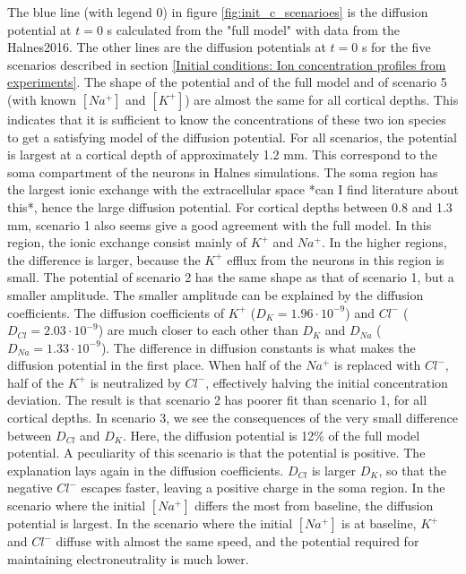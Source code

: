 \documentclass{article}
\begin{document}
The blue line (with legend 0) in figure \ref{fig:init_c_scenarioes} is the diffusion potential at $t=0$ s calculated from the "full model" with data from the Halnes2016. The other lines are the diffusion potentials at $t=0$ s for the five scenarios described in section \ref{Initial conditions: Ion concentration profiles from experiments}.  The shape of the potential and of the full model and of scenario 5 (with known $[Na^+]$ and $[K^+]$) are almost the same for all cortical depths. This indicates that it is sufficient to know the concentrations of these two ion species to get a satisfying model of the diffusion potential. For all scenarios, the potential is largest at a cortical depth of approximately 1.2 mm. This correspond to the soma compartment of the neurons in Halnes simulations. The soma region has the largest ionic exchange with the extracellular space *can I find literature about this*, hence the large diffusion potential. For cortical depths between 0.8 and 1.3 mm, scenario 1 also seems give a good agreement with the full model. In this region, the ionic exchange consist mainly of $K^+$ and $Na^+$. In the higher regions, the difference is larger, because the $K^+$ efflux from the neurons in this region is small. The potential of scenario 2 has the same shape as that of scenario 1, but a smaller amplitude. The smaller amplitude can be explained by the diffusion coefficients. The diffusion coefficients of $K^+$ ($D_K = 1.96\cdot 10^{-9}$) and $Cl^-$ ($D_{Cl} = 2.03\cdot 10^{-9}$) are much closer to each other than $D_K$ and $D_{Na}$ ($D_{Na} = 1.33\cdot 10^{-9}$).  The difference in diffusion constants is what makes the diffusion potential in the first place. When half of the $Na^+ $ is replaced with $Cl^-$, half of the $K^+$ is neutralized by $Cl^-$, effectively halving the initial concentration deviation. The result is that scenario 2 has poorer fit than scenario 1, for all cortical depths. In scenario 3, we see the consequences of the very small difference between $D_{Cl}$ and $D_K$. Here, the diffusion potential is 12\% of the full model potential. A peculiarity of this scenario is that the potential is positive. The explanation lays again in the diffusion coefficients. $D_{Cl}$ is larger $D_K$, so that the negative $Cl^-$ escapes faster, leaving a positive charge in the soma region. In the scenario where the initial $[Na^+]$ differs the most from baseline, the diffusion potential is largest. In the scenario where the initial $[Na^+]$ is at baseline, $K^+$ and $Cl^-$ diffuse with almost the same speed, and the potential required for maintaining electroneutrality is much lower. 
\end{document}
